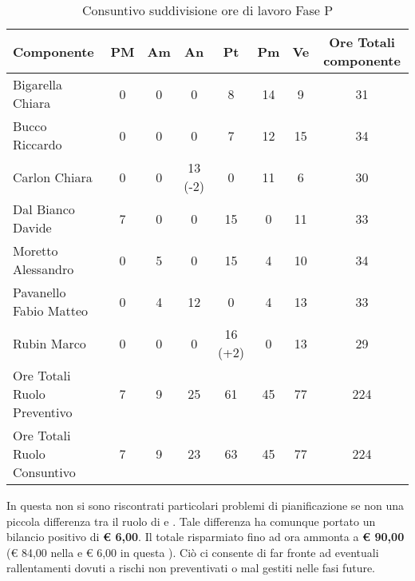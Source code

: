 			\begin{table}[H]
				\begin{center}
					\begin{tabular}{| l | c | c | c | c | c | c | c |}
						\hline
						Componente 					& PM	& Am 	& An 	& Pt 		& Pm 		& Ve 	& Ore Totali componente \\ \hline
						
						Bigarella Chiara 			& 0		& 0		& 0		& 8 		& 14 		& 9 		& 31 \\
						Bucco Riccardo 				& 0		& 0		& 0		& 7 		& 12		& 15 		& 34 \\
						Carlon Chiara	 			& 0		& 0		& 13 (-2) & 0		& 11 		& 6 		& 30 \\
						Dal Bianco Davide 			& 7 	& 0		& 0		& 15 		& 0			& 11 		& 33 \\
						Moretto Alessandro 			& 0		& 5 	& 0		& 15 		& 4 		& 10 		& 34 \\
						Pavanello Fabio Matteo	 	& 0		& 4		& 12 	& 0			& 4 		& 13 		& 33 \\
						Rubin Marco					& 0		& 0 	& 0		& 16 (+2)	& 0			& 13 		& 29 \\ \hline \hline
						
						Ore Totali Ruolo Preventivo & 7 	& 9 	& 25 	& 61 		& 45 		& 77 		& 224	\\ 
						Ore Totali Ruolo Consuntivo & 7 	& 9 	& 23    & 63		& 45 		& 77 		& 224	\\ \hline
					\end{tabular}
				\end{center}
				\caption{Consuntivo suddivisione ore di lavoro Fase P}
			\end{table}

			In questa  non si sono riscontrati particolari problemi di pianificazione se non una piccola differenza tra il ruolo di  e . Tale differenza ha comunque portato un bilancio positivo di \textbf{\euro{} 6,00}.
			Il totale risparmiato fino ad ora ammonta a \textbf{\euro{} 90,00} (\euro{} 84,00 nella  e \euro{} 6,00 in questa ). Ciò ci consente di far fronte ad eventuali rallentamenti dovuti a rischi non preventivati o mal gestiti nelle fasi future.
	

